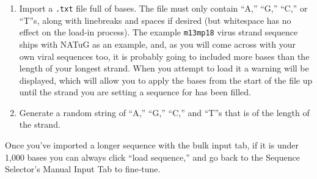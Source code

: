 \documentclass[titlepage]{article}
\begin{document}
\begin{enumerate}
	\item Import a \texttt{.txt} file full of bases. The file must only contain ``A,'' ``G,'' ``C,'' or ``T''s, along with linebreaks and spaces if desired (but whitespace has no effect on the load-in process). The example \texttt{m13mp18} virus strand sequence ships with NATuG as an example, and, as you will come across with your own viral sequences too, it is probably going to included more bases than the length of your longest strand. When you attempt to load it a warning will be displayed, which will allow you to apply the bases from the start of the file up until the strand you are setting a sequence for has been filled.
	
	\item Generate a random string of ``A,'' ``G,'' ``C,'' and ``T''s that is of the length of the strand.
\end{enumerate}

Once you've imported a longer sequence with the bulk input tab, if it is under 1,000 bases you can always click ``load sequence,'' and go back to the Sequence Selector's Manual Input Tab to fine-tune.
\end{document}
